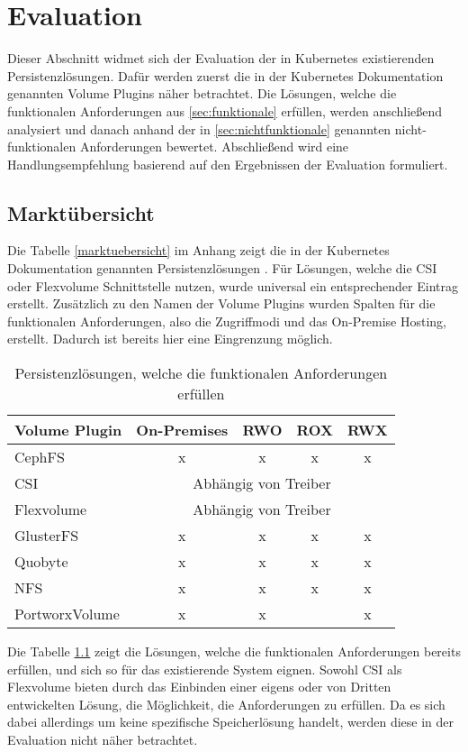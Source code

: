 \chapter{Evaluation}
\label{cha:evaluation}

Dieser Abschnitt widmet sich der Evaluation der in Kubernetes existierenden Persistenzlösungen. Dafür werden zuerst die in der Kubernetes Dokumentation genannten Volume Plugins näher betrachtet. Die Lösungen, welche die funktionalen Anforderungen aus \ref{sec:funktionale} erfüllen, werden anschließend analysiert und danach anhand der in \ref{sec:nichtfunktionale} genannten nicht-funktionalen Anforderungen bewertet. Abschließend wird eine Handlungsempfehlung basierend auf den Ergebnissen der Evaluation formuliert.

\section{Marktübersicht}
Die Tabelle \ref{marktuebersicht} im Anhang zeigt die in der Kubernetes Dokumentation genannten Persistenzlösungen \cite{kube:volumes}. Für Lösungen, welche die \ac{CSI} oder Flexvolume Schnittstelle nutzen, wurde universal ein entsprechender Eintrag erstellt. Zusätzlich zu den Namen der Volume Plugins wurden Spalten für die funktionalen Anforderungen, also die Zugriffmodi und das On-Premise Hosting, erstellt. Dadurch ist bereits hier eine Eingrenzung möglich.


\begin{table}[h!]
\centering
\begin{tabular}{lcccc} \hline
\textbf{Volume Plugin} & \textbf{On-Premises} & \textbf{RWO} & \textbf{ROX} & \textbf{RWX}\\ \hline
CephFS & x & x & x & x\\
CSI & \multicolumn{4}{c}{Abhängig von Treiber} \\
Flexvolume & \multicolumn{4}{c}{Abhängig von Treiber} \\
GlusterFS & x & x & x& x\\
Quobyte & x & x & x& x\\
NFS & x & x & x& x\\
PortworxVolume & x & x & & x \\

\end{tabular}
\caption{Persistenzlösungen, welche die funktionalen Anforderungen erfüllen}
\label{marktuebersicht2}
\end{table}
Die Tabelle \ref{marktuebersicht2} zeigt die Lösungen, welche die funktionalen Anforderungen bereits erfüllen, und sich so für das existierende System eignen. Sowohl \ac{CSI} als Flexvolume bieten durch das Einbinden einer eigens oder von Dritten entwickelten Lösung, die Möglichkeit, die Anforderungen zu erfüllen. Da es sich dabei allerdings um keine spezifische Speicherlösung handelt, werden diese in der Evaluation nicht näher betrachtet. 

